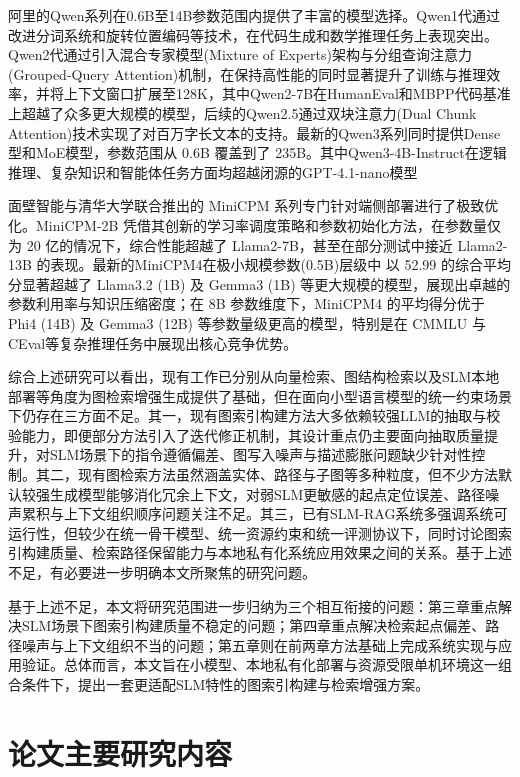 \documentclass[promaster, vlined]{DissertUESTC}
\begin{document}
阿里的Qwen系列在0.6B至14B参数范围内提供了丰富的模型选择。Qwen1代通过改进分词系统和旋转位置编码等技术，在代码生成和数学推理任务上表现突出\cite{bai2023qwen}。Qwen2代通过引入混合专家模型(Mixture of Experts)架构与分组查询注意力(Grouped-Query Attention)机制，在保持高性能的同时显著提升了训练与推理效率，并将上下文窗口扩展至128K，其中Qwen2-7B在HumanEval和MBPP代码基准上超越了众多更大规模的模型\cite{team2024qwen2}，后续的Qwen2.5通过双块注意力(Dual Chunk Attention)技术实现了对百万字长文本的支持\cite{qwen2.5}。最新的Qwen3系列同时提供Dense型和MoE模型，参数范围从 0.6B 覆盖到了 235B\cite{qwen3}。其中Qwen3-4B-Instruct在逻辑推理、复杂知识和智能体任务方面均超越闭源的GPT-4.1-nano模型\cite{qwen3-4b-instruct-2507}

面壁智能与清华大学联合推出的 MiniCPM 系列专门针对端侧部署进行了极致优化。MiniCPM-2B 凭借其创新的学习率调度策略和参数初始化方法，在参数量仅为 20 亿的情况下，综合性能超越了 Llama2-7B，甚至在部分测试中接近 Llama2-13B 的表现\cite{hu2024minicpm}。最新的MiniCPM4在极小规模参数(0.5B)层级中 以 52.99 的综合平均分显著超越了 Llama3.2 (1B) 及 Gemma3 (1B) 等更大规模的模型，展现出卓越的参数利用率与知识压缩密度；在 8B 参数维度下，MiniCPM4 的平均得分优于 Phi4 (14B) 及 Gemma3 (12B) 等参数量级更高的模型，特别是在 CMMLU 与 CEval等复杂推理任务中展现出核心竞争优势。\cite{team2025minicpm4}

综合上述研究可以看出，现有工作已分别从向量检索、图结构检索以及SLM本地部署等角度为图检索增强生成提供了基础，但在面向小型语言模型的统一约束场景下仍存在三方面不足。其一，现有图索引构建方法大多依赖较强LLM的抽取与校验能力，即便部分方法引入了迭代修正机制，其设计重点仍主要面向抽取质量提升，对SLM场景下的指令遵循偏差、图写入噪声与描述膨胀问题缺少针对性控制。其二，现有图检索方法虽然涵盖实体、路径与子图等多种粒度，但不少方法默认较强生成模型能够消化冗余上下文，对弱SLM更敏感的起点定位误差、路径噪声累积与上下文组织顺序问题关注不足。其三，已有SLM-RAG系统多强调系统可运行性，但较少在统一骨干模型、统一资源约束和统一评测协议下，同时讨论图索引构建质量、检索路径保留能力与本地私有化系统应用效果之间的关系。基于上述不足，有必要进一步明确本文所聚焦的研究问题。

基于上述不足，本文将研究范围进一步归纳为三个相互衔接的问题：第三章重点解决SLM场景下图索引构建质量不稳定的问题；第四章重点解决检索起点偏差、路径噪声与上下文组织不当的问题；第五章则在前两章方法基础上完成系统实现与应用验证。总体而言，本文旨在小模型、本地私有化部署与资源受限单机环境这一组合条件下，提出一套更适配SLM特性的图索引构建与检索增强方案。


\section{论文主要研究内容}
\end{document}
